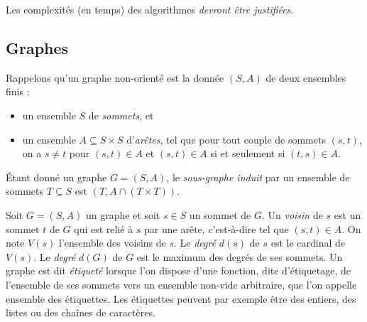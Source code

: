 Les complexités (en temps) des algorithmes \emph{devront être justifiées}. 
\subsection*{Graphes}
Rappelons qu'un graphe non-orienté est la donnée $(S,A)$ de deux ensembles finis : \begin{itemize} 
    \item  un ensemble $S$ de \emph{sommets}, et
    \item un ensemble $A \subseteq S\times S$ d'\emph{arêtes}, tel que pour tout couple de sommets $(s,t)$, on a $s\ne t$ pour $(s, t) \in A$ et  $(s,t) \in A$ si et seulement si $(t,s) \in A$.
\end{itemize}

Étant donné un graphe $G = (S,A)$, le \emph{sous-graphe induit} par un ensemble de sommets $T \subseteq S$ est $(T,A\cap (T\times T))$. 

Soit $G = (S,A)$ un graphe et soit $s \in S$ un sommet de $G$. Un \emph{voisin} de $s$ est un sommet $t$ de $G$ qui est relié à $s$ par une arête, c'est-à-dire tel que $(s,t)\in A$. On note $V(s)$ l'ensemble des voisins de $s$. Le \emph{degré} $d(s)$ de $s$ est le cardinal de $V(s)$. Le \emph{degré} $d(G)$ de $G$ est le maximum des degrés de ses sommets. 
Un graphe est dit \emph{étiqueté} lorsque l'on dispose d'une fonction, dite d'étiquetage, de l'ensemble de ses sommets vers un ensemble non-vide arbitraire, que l'on appelle ensemble des étiquettes. Les étiquettes peuvent par exemple être des entiers, des listes ou des chaînes de caractères. 
